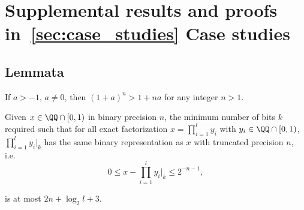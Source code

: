 \section{Supplemental results and proofs in~\texorpdfstring{\cref{sec:case_studies}}{reference} Case studies}\label{sec:supp_case_studies}
\subsection{Lemmata}
\begin{lemma}\label{lem:bernoulli}
    If $a>-1$, $a\neq 0$, then $(1+a)^n > 1+na$ for any integer $n>1$.
\end{lemma}

\begin{lemma}\label{lem:product_precision}
    Given $x\in\QQ \cap [0,1)$ in binary precision $n$, the minimum number of bits $k$ required such that for all exact factorization $x = \prod_{i=1}^l y_i$ with $y_i\in\QQ \cap [0,1)$, 
    $\prod_{i=1}^l y_i|_k$ has the same binary representation as $x$ with truncated precision $n$, i.e.
   \[
   0 \leq x - \prod_{i=1}^l y_i|_k  \leq 2^{-n-1},
   \]
    
    is at most $2n+\log_2 l + 3$.
\end{lemma}

